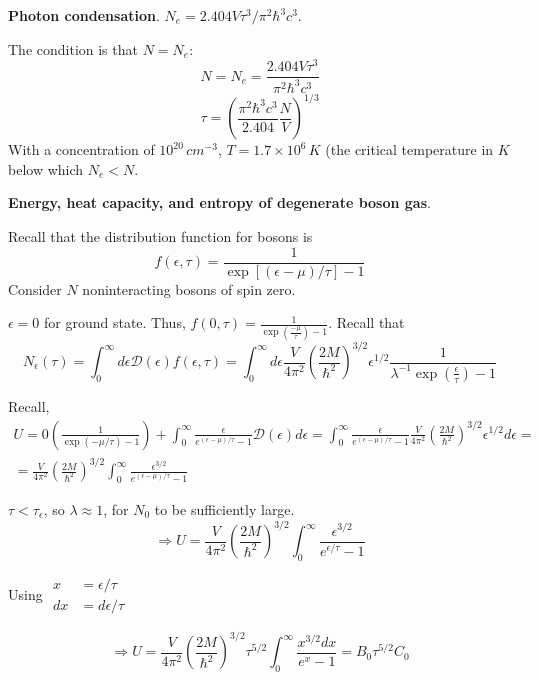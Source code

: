  \textbf{Photon condensation}.  $N_e = 2.404 V \tau^3/ \pi^2 \hbar^3 c^3$.  

The condition is that $N=N_e$:
\[
N = N_e = \frac{ 2.404 V \tau^3}{ \pi^2 \hbar^3 c^3}
\]
\[
\boxed{ \tau = \left( \frac{\pi^2 \hbar^3 c^3}{2.404 } \frac{ N}{ V} \right)^{1/3} }
\]
With a concentration of $10^{20} \, cm^{-3}$, 
$T = 1.7 \times 10^{6} \, K$ (the critical temperature in $K$ below which $N_e < N$.  

 \textbf{Energy, heat capacity, and entropy of degenerate boson gas}.  

Recall that the distribution function for bosons is 
\[
f(\epsilon,\tau) = \frac{1}{ \exp{ [ ( \epsilon - \mu)/\tau ] } - 1 }
\]
Consider $N$ noninteracting bosons of spin zero.

$\epsilon =0$ for ground state.  Thus, $f(0,\tau) = \frac{1}{ \exp{ \left( \frac{- \mu}{ \tau} \right) } - 1 }$.  
Recall that 
\[
N_{\epsilon}(\tau) = \int_0^{\infty} d\epsilon \mathcal{D}(\epsilon) f(\epsilon, \tau) = \int_0^{\infty} d\epsilon \frac{V}{4 \pi^2} \left( \frac{ 2M }{ \hbar^2} \right)^{3/2} \epsilon^{1/2} \frac{1}{ \lambda^{-1} \exp{ \left( \frac{ \epsilon}{\tau} \right)} - 1 } 
\]

Recall, 
\[
\begin{gathered}
  U = 0 \left( \frac{1}{ \exp{ ( - \mu/\tau) } - 1 } \right) + \int_0^{\infty} \frac{ \epsilon}{ e^{ (\epsilon -\mu )/ \tau } - 1 } \mathcal{D}(\epsilon) d\epsilon = \int_0^{\infty} \frac{ \epsilon }{ e^{(\epsilon - \mu)/\tau} - 1 } \frac{V}{4\pi^2} \left( \frac{ 2M}{\hbar^2} \right)^{3/2} \epsilon^{1/2} d\epsilon = \\
    = \frac{V}{4\pi^2 } \left( \frac{ 2M }{ \hbar^2} \right)^{3/2} \int_0^{\infty} \frac{ \epsilon^{3/2}}{ e^{ (\epsilon - \mu )/\tau}  -1 }
\end{gathered}
\]

$\tau < \tau_{\epsilon}$, so $\lambda \approx 1$, for $N_0$ to be sufficiently large.  
\[
\Longrightarrow U = \frac{V}{4 \pi^2} \left( \frac{2M}{ \hbar^2} \right)^{3/2} \int_0^{\infty} \frac{ \epsilon^{3/2}}{ e^{\epsilon/ \tau}  -1 } 
\]

Using $\begin{aligned} x & = \epsilon/\tau  \\ dx & = d\epsilon/\tau \end{aligned}$  

\[
\Longrightarrow U = \frac{V}{4 \pi^2 } \left( \frac{ 2M}{ \hbar^2} \right)^{3/2} \tau^{5/2} \int_0^{\infty} \frac{ x^{3/2} dx }{ e^x - 1 } = B_0 \tau^{5/2} C_0
\]

